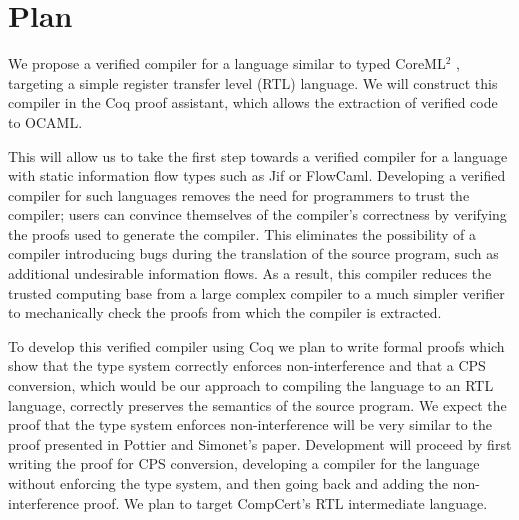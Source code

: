 \section{Plan}

We propose a verified compiler for a language similar to typed CoreML$^2$
\cite{InfoFlowML}, targeting a simple register transfer level (RTL) language.  
We will construct this compiler in the Coq proof assistant\cite{coqart}, 
which allows the extraction of verified code to OCAML\cite{berghofer2004extracting}.

This will allow us to take the first step towards a verified compiler
for a language with static information flow types such as
Jif\cite{myers1999jflow} or
FlowCaml\cite{simonet2003flow,simonet2003flowmanual}.  Developing a
verified compiler for such languages removes the need for programmers to
trust the compiler; users can convince themselves of the compiler's 
correctness by verifying the proofs used to generate the compiler.
This eliminates the possibility of a compiler
introducing bugs during the translation of the source program, such
as additional undesirable information flows.  As a result, this compiler
reduces the trusted computing base from a large complex compiler to a
much simpler verifier to mechanically check the proofs from which 
the compiler is extracted.

To develop this verified compiler using Coq we plan to write formal
proofs which show that the type system correctly enforces non-interference
and that a CPS conversion\cite{appel2007compiling}, which would be our
approach to compiling the language to an RTL language, correctly
preserves the semantics of the source program.  We expect the proof
that the type system enforces non-interference will be very similar to
the proof presented in Pottier and Simonet's paper\cite{InfoFlowML}.
Development will proceed by first writing the proof for CPS conversion,
developing a compiler for the language without enforcing the type
system, and then going back and adding the non-interference proof.
We plan to target CompCert's RTL intermediate language.
